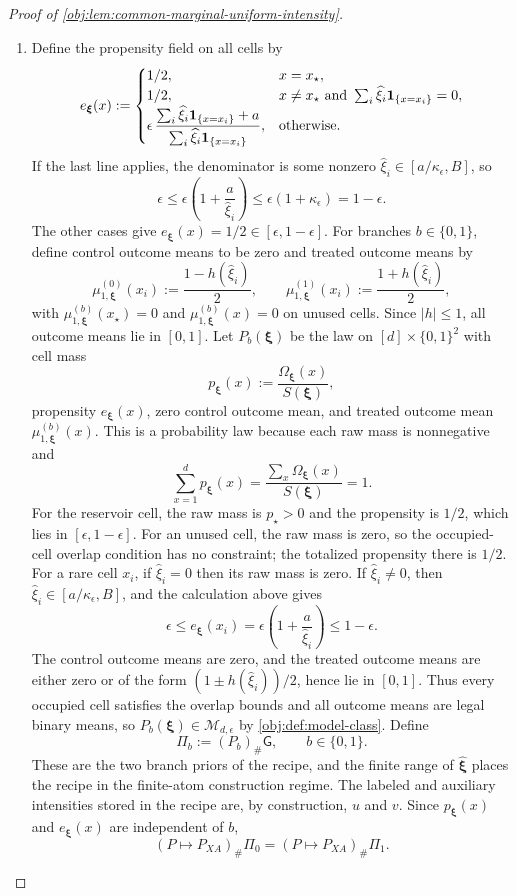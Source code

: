 \begin{proof}[Proof of \cref{obj:lem:common-marginal-uniform-intensity}]
\begin{enumerate}
\item Define the propensity field on all cells by
\[
e_{\boldsymbol\xi}(x)
:=
\begin{cases}
1/2, & x=x_\star,\\
1/2, & x\ne x_\star\ \text{and}\ \sum_i\widehat\xi_i{\bf 1}_{\{x=x_i\}}=0,\\
\displaystyle
\epsilon\,
\frac{\sum_i\widehat\xi_i{\bf 1}_{\{x=x_i\}}+a}
{\sum_i\widehat\xi_i{\bf 1}_{\{x=x_i\}}},
& \text{otherwise}.
\end{cases}
\]
If the last line applies, the denominator is some nonzero \(\widehat\xi_i\in[a/\kappa_\epsilon,B]\), so
\[
\epsilon
\le
\epsilon\left(1+\frac{a}{\widehat\xi_i}\right)
\le
\epsilon(1+\kappa_\epsilon)
=1-\epsilon .
\]
The other cases give \(e_{\boldsymbol\xi}(x)=1/2\in[\epsilon,1-\epsilon]\). For branches \(b\in\{0,1\}\), define control outcome means to be zero and treated outcome means by
\[
\mu_{1,\boldsymbol\xi}^{(0)}(x_i)
:=
\frac{1-h(\widehat\xi_i)}2,\qquad
\mu_{1,\boldsymbol\xi}^{(1)}(x_i)
:=
\frac{1+h(\widehat\xi_i)}2,
\]
with \(\mu_{1,\boldsymbol\xi}^{(b)}(x_\star)=0\) and
\(\mu_{1,\boldsymbol\xi}^{(b)}(x)=0\) on unused cells. Since \(|h|\le1\), all outcome means lie in \([0,1]\). Let \(P_b(\boldsymbol\xi)\) be the law on \([d]\times\{0,1\}^2\) with cell mass
\[
p_{\boldsymbol\xi}(x):=\frac{\Omega_{\boldsymbol\xi}(x)}{S(\boldsymbol\xi)},
\]
propensity \(e_{\boldsymbol\xi}(x)\), zero control outcome mean, and treated outcome mean \(\mu_{1,\boldsymbol\xi}^{(b)}(x)\). This is a probability law because each raw mass is nonnegative and
\[
\sum_{x=1}^d p_{\boldsymbol\xi}(x)
=
\frac{\sum_x\Omega_{\boldsymbol\xi}(x)}{S(\boldsymbol\xi)}=1 .
\]
For the reservoir cell, the raw mass is \(p_\star>0\) and the propensity is \(1/2\), which lies in \([\epsilon,1-\epsilon]\). For an unused cell, the raw mass is zero, so the occupied-cell overlap condition has no constraint; the totalized propensity there is \(1/2\). For a rare cell \(x_i\), if \(\widehat\xi_i=0\) then its raw mass is zero. If \(\widehat\xi_i\ne0\), then \(\widehat\xi_i\in[a/\kappa_\epsilon,B]\), and the calculation above gives
\[
\epsilon\le e_{\boldsymbol\xi}(x_i)
=\epsilon\left(1+\frac a{\widehat\xi_i}\right)
\le 1-\epsilon .
\]
The control outcome means are zero, and the treated outcome means are either zero or of the form \((1\pm h(\widehat\xi_i))/2\), hence lie in \([0,1]\). Thus every occupied cell satisfies the overlap bounds and all outcome means are legal binary means, so \(P_b(\boldsymbol\xi)\in\mathcal M_{d,\epsilon}\) by \cref{obj:def:model-class}. Define
\[
\Pi_b:=(P_b)_\#\mathsf G,\qquad b\in\{0,1\}.
\]
These are the two branch priors of the recipe, and the finite range of \(\widehat{\boldsymbol\xi}\) places the recipe in the finite-atom construction regime. The labeled and auxiliary intensities stored in the recipe are, by construction, \(u\) and \(v\). Since \(p_{\boldsymbol\xi}(x)\) and \(e_{\boldsymbol\xi}(x)\) are independent of \(b\),
\[
(P\mapsto P_{XA})_\#\Pi_0
=
(P\mapsto P_{XA})_\#\Pi_1 .
\]


\end{enumerate}
\end{proof}
